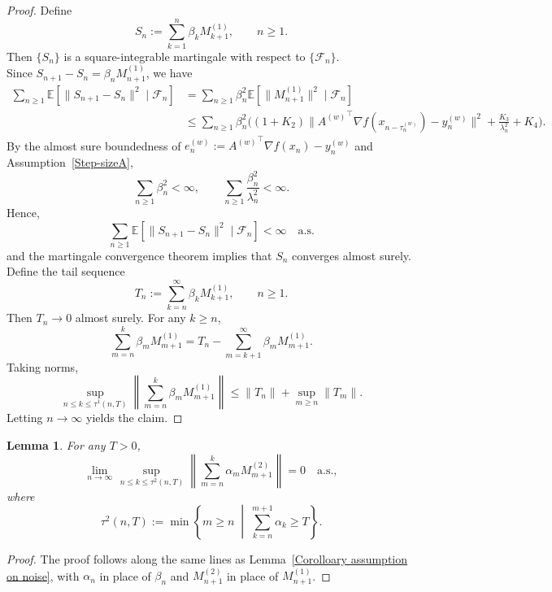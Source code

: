 \documentclass{article}
\newtheorem{lemma}[theorem]{Lemma}
\begin{document}
\begin{proof}
Define
\[
S_n := \sum_{k=1}^{n} \beta_k M_{k+1}^{(1)}, \qquad n \ge 1 .
\]
Then $\{S_n\}$ is a square-integrable martingale with respect to
$\{\mathcal{F}_n\}$.
\\ Since $S_{n+1}-S_n=\beta_n M_{n+1}^{(1)}$, we have
\begin{equation}
\begin{aligned}
\sum_{n \ge 1}
\mathbb{E}\!\left[
\| S_{n+1} - S_n \|^2 \mid \mathcal{F}_n
\right]
&= \sum_{n \ge 1} \beta_n^2
\mathbb{E}\!\left[
\| M_{n+1}^{(1)} \|^2 \mid \mathcal{F}_n
\right] \\
&\le \sum_{n \ge 1} \beta_n^2
\Bigg(
(1+K_2)
\big\|
{A^{(w)}}^\top \nabla f(x_{n- \tau_n^{(w)}}) - y_n^{(w)}
\big\|^2
+ \frac{K_3}{\lambda_n^2}
+ K_4
\Bigg).
\end{aligned}
\end{equation}
By the almost sure boundedness of
$e_n^{(w)} := {A^{(w)}}^\top \nabla f(x_{n}) - y_n^{(w)}$
and Assumption~\ref{Step-sizeA},
\[
\sum_{n \ge 1} \beta_n^2 < \infty,
\qquad
\sum_{n \ge 1} \frac{\beta_n^2}{\lambda_n^2} < \infty.
\]
Hence,
\[
\sum_{n \ge 1}
\mathbb{E}\!\left[
\| S_{n+1} - S_n \|^2 \mid \mathcal{F}_n
\right]
< \infty
\quad \text{a.s.}
\]
and the martingale convergence theorem implies that $S_n$ converges almost surely.
\\ Define the tail sequence
\[
T_n := \sum_{k=n}^{\infty} \beta_k M_{k+1}^{(1)}, \qquad n \ge 1 .
\]
Then $T_n \to 0$ almost surely. For any $k \ge n$,
\[
\sum_{m=n}^{k} \beta_m M_{m+1}^{(1)}
= T_n - \sum_{m=k+1}^{\infty} \beta_m M_{m+1}^{(1)} .
\]
Taking norms,
\[
\sup_{n \le k \le \tau^1(n,T)}
\left\|
\sum_{m=n}^{k} \beta_m M_{m+1}^{(1)}
\right\|
\le \|T_n\| + \sup_{m \ge n} \|T_m\|.
\]
Letting $n \to \infty$ yields the claim.
\end{proof}

\begin{lemma}
For any $T>0$,
\[
\lim_{n \to \infty}
\sup_{\, n \le k \le \tau^2(n,T)}
\left\|
\sum_{m=n}^{k} \alpha_m M_{m+1}^{(2)}
\right\|
= 0 \quad \text{a.s.},
\]
where
\[
\tau^2(n,T)
:= \min \left\{ m \ge n \;\middle|\; \sum_{k=n}^{m+1} \alpha_k \ge T \right\}.
\]
\label{LemmaNoiseSlow}
\end{lemma}

\begin{proof}
The proof follows along the same lines as Lemma~\ref{Corolloary assumption on noise},
with $\alpha_n$ in place of $\beta_n$ and $M_{n+1}^{(2)}$ in place of
$M_{n+1}^{(1)}$.
\end{proof}
\end{document}
